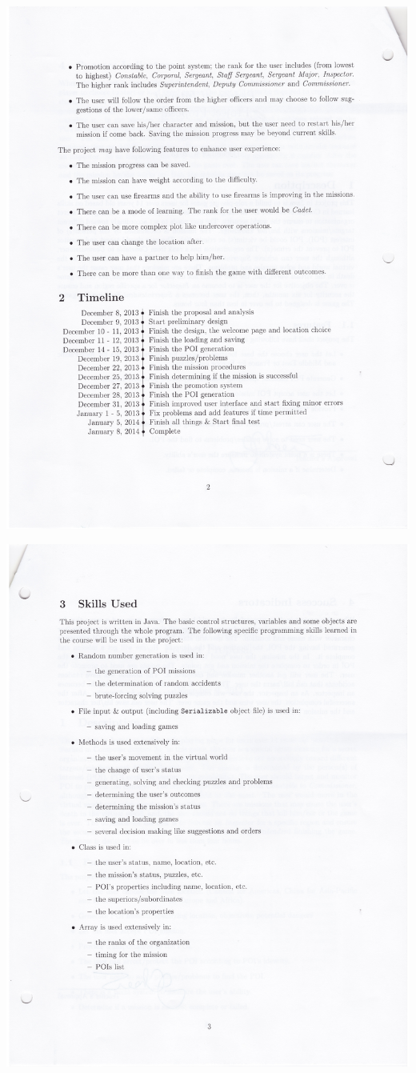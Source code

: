\documentclass[letterpaper, 12pt]{report}
\begin{document}
\includegraphics[width=0.9\linewidth]{./img/prop-2}

\includegraphics[width=0.9\linewidth]{./img/prop-3}
\end{document}
